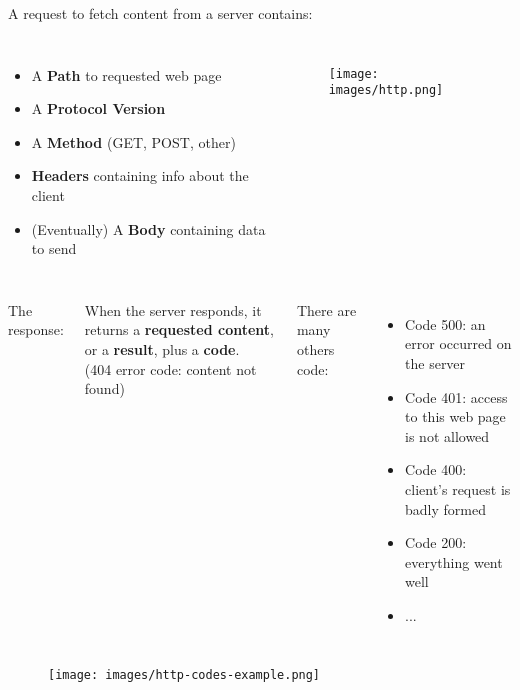 \documentclass{beamer}[10pt, usepdftitle=false handout]
\begin{document}
\begin{frame}


A request to fetch content from a server contains:
\vspace*{0.6em}

\begin{columns}[c]

\begin{itemize}
\item{A \textbf{Path} to requested web page}
\item{A \textbf{Protocol Version}}
\item{A \textbf{Method} (GET, POST, other)}
\item{\textbf{Headers} containing info about the client}
\item{(Eventually) A \textbf{Body} containing data to send}
\end{itemize}


\begin{figure}
\texttt{[image: images/http.png]} 
\end{figure}

\end{columns}

\end{frame}

\begin{frame}

\begin{columns}[c]
The response:
\vspace*{0.6em}

When the server responds, it returns a \textbf{requested content}, or a \textbf{result}, plus a \textbf{code}. \\
(404 error code: content not found) 


There are many others code:
\vspace*{0.6em}
\begin{itemize}
\item{Code 500: an error occurred on the server}
\item{Code 401: access to this web page is not allowed}
\item{Code 400: client's request is badly formed}
\item{Code 200: everything went well}
\item{...}
\end{itemize}
\end{columns}

	\begin{figure}
	\texttt{[image: images/http-codes-example.png]} 
	\end{figure}




\end{frame}
\end{document}
